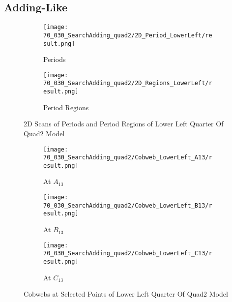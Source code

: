 \subsection{Adding-Like}

\begin{figure}
    \centering
    \begin{subfigure}{0.4\textwidth}
        \centering
        \texttt{[image: 70\_030\_SearchAdding\_quad2/2D\_Period\_LowerLeft/result.png]}
        \caption{Periods}
    \end{subfigure}
    \begin{subfigure}{0.4\textwidth}
        \centering
        \texttt{[image: 70\_030\_SearchAdding\_quad2/2D\_Regions\_LowerLeft/result.png]}
        \caption{Period Regions}
    \end{subfigure}
    \caption{2D Scans of Periods and Period Regions of Lower Left Quarter Of Quad2 Model}
\end{figure}

\begin{figure}
    \centering
    \begin{subfigure}{0.3\textwidth}
        \centering
        \texttt{[image: 70\_030\_SearchAdding\_quad2/Cobweb\_LowerLeft\_A13/result.png]}
        \caption{At $A_{13}$}
    \end{subfigure}
    \begin{subfigure}{0.3\textwidth}
        \centering
        \texttt{[image: 70\_030\_SearchAdding\_quad2/Cobweb\_LowerLeft\_B13/result.png]}
        \caption{At $B_{13}$}
    \end{subfigure}
    \begin{subfigure}{0.3\textwidth}
        \centering
        \texttt{[image: 70\_030\_SearchAdding\_quad2/Cobweb\_LowerLeft\_C13/result.png]}
        \caption{At $C_{13}$}
    \end{subfigure}
    \caption{Cobwebs at Selected Points of Lower Left Quarter Of Quad2 Model}
\end{figure}
